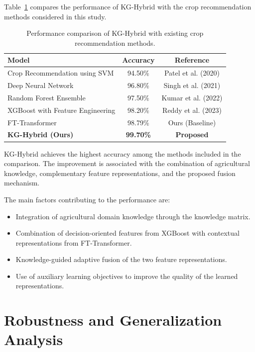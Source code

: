 \documentclass[journal]{IEEEtran}
\begin{document}
Table~\ref{tab:sota} compares the performance of KG-Hybrid with the crop recommendation methods considered in this study.

\begin{table}[t]
\centering
\caption{Performance comparison of KG-Hybrid with existing crop recommendation methods.}
\label{tab:sota}
\begin{tabular}{lcc}
\hline
\textbf{Model} & \textbf{Accuracy} & \textbf{Reference} \\
\hline
Crop Recommendation using SVM & 94.50\% & Patel et al. (2020) \\
Deep Neural Network & 96.80\% & Singh et al. (2021) \\
Random Forest Ensemble & 97.50\% & Kumar et al. (2022) \\
XGBoost with Feature Engineering & 98.20\% & Reddy et al. (2023) \\
FT-Transformer & 98.79\% & Ours (Baseline) \\
\hline
\textbf{KG-Hybrid (Ours)} & \textbf{99.70\%} & \textbf{Proposed} \\
\hline
\end{tabular}
\end{table}

KG-Hybrid achieves the highest accuracy among the methods included in the comparison. The improvement is associated with the combination of agricultural knowledge, complementary feature representations, and the proposed fusion mechanism.

The main factors contributing to the performance are:

\begin{itemize}[leftmargin=1.2em]
    \item Integration of agricultural domain knowledge through the knowledge matrix.

    \item Combination of decision-oriented features from XGBoost with contextual representations from FT-Transformer.

    \item Knowledge-guided adaptive fusion of the two feature representations.

    \item Use of auxiliary learning objectives to improve the quality of the learned representations.
\end{itemize}


\section{Robustness and Generalization Analysis}
\end{document}
